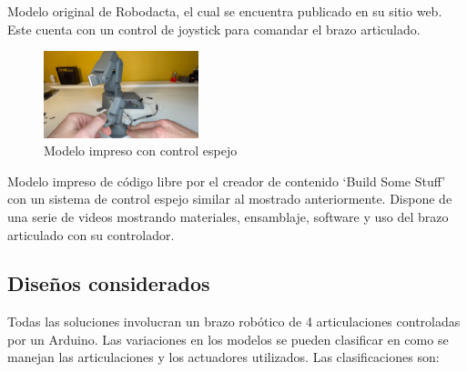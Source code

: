 \begin{multicols}{2}
Modelo original de Robodacta, el cual se encuentra publicado en su sitio web. Este cuenta con un control de joystick para comandar el brazo articulado.

\begin{figure}[H]
  \centering
  \includegraphics[width=0.4\textwidth]{anexos/inspiraciones/10impreso.png}
  \caption{Modelo impreso con control espejo~\cite{youtube_robot_arm_mirror}}\label{fig:insp.impreso}
\end{figure}

Modelo impreso de código libre por el creador de contenido `Build Some Stuff' con un sistema de control espejo similar al mostrado anteriormente. Dispone de una serie de videos mostrando materiales, ensamblaje, software y uso del brazo articulado con su controlador. 

\end{multicols}

\subsection{Diseños considerados}
Todas las soluciones involucran un brazo robótico de 4 articulaciones controladas por un Arduino. Las variaciones en los modelos se pueden clasificar en como se manejan las articulaciones y los actuadores utilizados. Las clasificaciones son:

